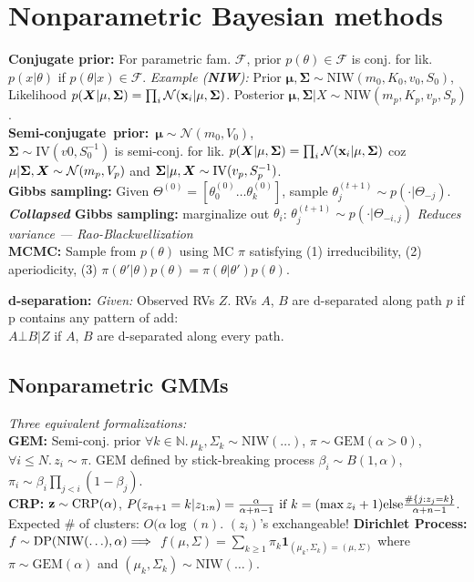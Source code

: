 \section*{Nonparametric Bayesian methods}
\textbf{Conjugate prior:} For parametric fam. $\mathcal{F}$, prior $p(\theta)\in\mathcal{F}$ is conj. for lik. $p(x|\theta)$ if $p(\theta|x)\in\mathcal{F}$.
\emph{Example (\textbf{NIW}):} Prior $\mathbf{\mu},\mathbf{\Sigma}\sim\mathrm{NIW}(m_0,K_0,v_0,S_0)$, Likelihood
$p({\bm{X}}|\mathbf{\mu},\mathbf{\Sigma}) = \prod_i \mathcal{N}({\mathbf{x}}_i|\mathbf{\mu},\mathbf{\Sigma})$.
Posterior $\mathbf{\mu},\mathbf{\Sigma}|X\sim\mathrm{NIW}(m_p,K_p,v_p,S_p)$.\\
\mbox{\textbf{Semi-conjugate prior:} $\mathbf{\mu}\sim\mathcal{N}(m_0,V_0)$,}\\$\mathbf{\Sigma}\sim\mathrm{IV}(v0,S_0^{-1})$ is semi-conj. for lik. $p({\bm{X}}|\mathbf{\mu},\mathbf{\Sigma}) = \prod_i \mathcal{N}({\mathbf{x}}_i|\mathbf{\mu},\mathbf{\Sigma})$ coz $\mathbf{\mu}|\mathbf{\Sigma},{\bm{X}}\sim\mathcal{N}(m_p,V_p)$ and $\mathbf{\Sigma}|\mathbf{\mu},{\bm{X}}\sim\mathrm{IV}(v_p,S_p^{-1})$.\\
\textbf{Gibbs sampling:} Given $\Theta^{(0)} = [\theta^{(0)}_0\ldots\theta^{(0)}_k]$, sample $\theta_j^{(t+1)}\sim p(\cdot|\Theta_{-j})$.\\
\textbf{\emph{Collapsed} Gibbs sampling:} marginalize out $\theta_i$: $\theta_j^{(t+1)}\sim p(\cdot|\Theta_{-i,j})$ \emph{Reduces variance --- Rao-Blackwellization}\\
\textbf{MCMC:} Sample from $p(\theta)$ using MC $\pi$ satisfying
(1) irreducibility, (2) aperiodicity, (3) $\pi(\theta'|\theta)p(\theta) = \pi(\theta|\theta')p(\theta)$.

\textbf{d-separation:} \emph{Given:} Observed RVs $Z$.
RVs $A$, $B$ are d-separated along path $p$ if p contains
any pattern of {\color{red}add}:\\

$A \bot B | Z$ if $A$, $B$ are d-separated along every path.

\subsection*{Nonparametric GMMs}
\emph{Three equivalent formalizations:}\\
\textbf{GEM:} Semi-conj. prior $\forall k\in\mathbb{N}.\,\mu_k,\Sigma_k\sim\mathrm{NIW}(\ldots)$, $\pi\sim\mathrm{GEM}(\alpha > 0)$, $\forall i\leq N.\,z_i\sim\pi$.
GEM defined by stick-breaking process $\beta_i\sim B(1,\alpha)$, $\pi_i\sim\beta_i\prod_{j<i}(1-\beta_j)$.\\
\textbf{CRP:} ${\mathbf{z}}\sim\mathrm{CRP}(\alpha)$, $P(z_{n+1}=k|z_{1:n})= \frac{\alpha}{\alpha+n-1} {\color{black}\textrm{ if }} k=(\max z_i+1) {\color{black}\mathrm{ else }} \frac{\#\{j:z_j=k\}}{\alpha+n-1}$. Expected \# of clusters: $O(\alpha\log(n)$. $(z_i)$'s exchangeable! 
\textbf{Dirichlet Process:} $f\sim\mathrm{DP}(\mathrm{NIW}(\ldots),\alpha) {\color{black}\implies} $
$f(\mu,\Sigma)=\sum_{k\geq1}\pi_k\mathbf{1}_{(\mu_k,\Sigma_k)=(\mu,\Sigma)}$ where $\pi\sim\mathrm{GEM}(\alpha)$ and $(\mu_k,\Sigma_k)\sim\mathrm{NIW}(\ldots)$.